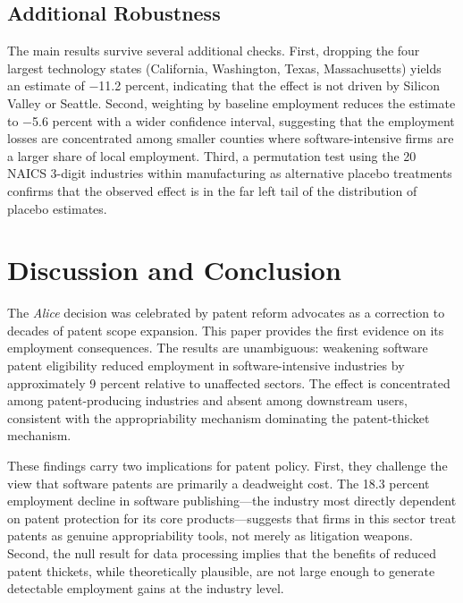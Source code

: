 \documentclass[12pt]{article}
\begin{document}
\subsection{Additional Robustness}

The main results survive several additional checks. First, dropping the four largest technology states (California, Washington, Texas, Massachusetts) yields an estimate of $-$11.2 percent, indicating that the effect is not driven by Silicon Valley or Seattle. Second, weighting by baseline employment reduces the estimate to $-$5.6 percent with a wider confidence interval, suggesting that the employment losses are concentrated among smaller counties where software-intensive firms are a larger share of local employment. Third, a permutation test using the 20 NAICS 3-digit industries within manufacturing as alternative placebo treatments confirms that the observed effect is in the far left tail of the distribution of placebo estimates.


\section{Discussion and Conclusion}

The \textit{Alice} decision was celebrated by patent reform advocates as a correction to decades of patent scope expansion. This paper provides the first evidence on its employment consequences. The results are unambiguous: weakening software patent eligibility reduced employment in software-intensive industries by approximately 9 percent relative to unaffected sectors. The effect is concentrated among patent-producing industries and absent among downstream users, consistent with the appropriability mechanism dominating the patent-thicket mechanism.

These findings carry two implications for patent policy. First, they challenge the view that software patents are primarily a deadweight cost. The 18.3 percent employment decline in software publishing---the industry most directly dependent on patent protection for its core products---suggests that firms in this sector treat patents as genuine appropriability tools, not merely as litigation weapons. Second, the null result for data processing implies that the benefits of reduced patent thickets, while theoretically plausible, are not large enough to generate detectable employment gains at the industry level.
\end{document}
